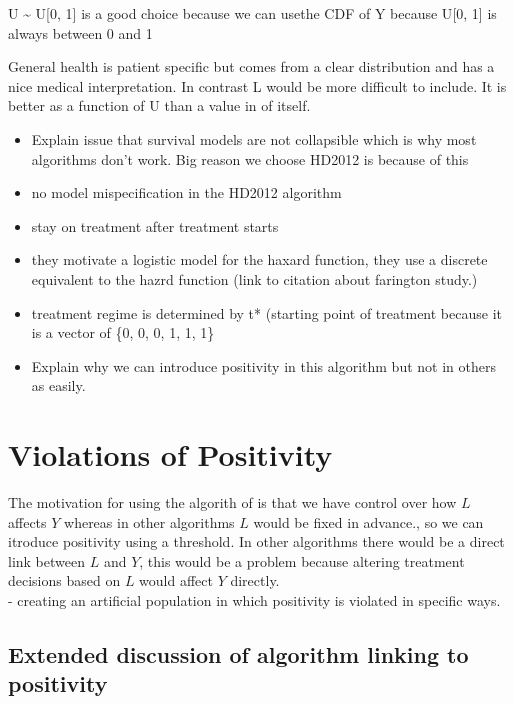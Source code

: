 \documentclass[11pt]{article}
\providecommand{\tightlist}{%
      \setlength{\itemsep}{0pt}\setlength{\parskip}{0pt}}
\begin{document}
U \textasciitilde{} U{[}0, 1{]} is a good choice because we can usethe
CDF of Y because U{[}0, 1{]} is always between 0 and 1

General health is patient specific but comes from a clear distribution
and has a nice medical interpretation. In contrast L would be more
difficult to include. It is better as a function of U than a value in of
itself.

\begin{itemize}
\tightlist
\item
  Explain issue that survival models are not collapsible which is why
  most algorithms don't work. Big reason we choose HD2012 is because of
  this
\item
  no model mispecification in the HD2012 algorithm
\item
  stay on treatment after treatment starts
\item
  they motivate a logistic model for the haxard function, they use a
  discrete equivalent to the hazrd function (link to citation about
  farington study.)
\item
  treatment regime is determined by t* (starting point of treatment
  because it is a vector of \{0, 0, 0, 1, 1, 1\}
\item
  Explain why we can introduce positivity in this algorithm but not in
  others as easily.
\end{itemize}

    \section{Violations of Positivity}\label{violations-of-positivity}

The motivation for using the algorith of \citet{Havercroft2012} is that
we have control over how \(L\) affects \(Y\) whereas in other algorithms
\(L\) would be fixed in advance., so we can itroduce positivity using a
threshold. In other algorithms there would be a direct link between
\(L\) and \(Y\), this would be a problem because altering treatment
decisions based on \(L\) would affect \(Y\) directly.\\
- creating an artificial population in which positivity is violated in
specific ways.

\subsection{Extended discussion of algorithm linking to
positivity}\label{extended-discussion-of-algorithm-linking-to-positivity}
\end{document}
